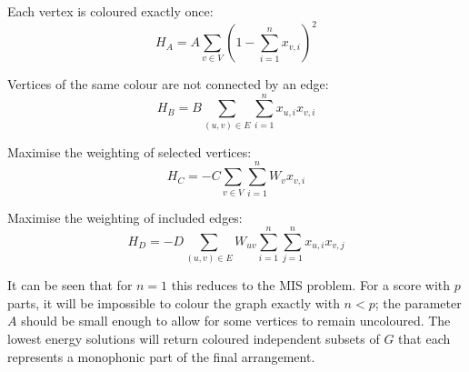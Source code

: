 \documentclass[aps,pra,12pt,onecolumn]{revtex4-2}
\begin{document}
Each vertex is coloured exactly once:
\begin{equation*}
    H_A = A\sum_{v \in V}\left(1-\sum_{i=1}^{n} x_{v,i}\right)^2
\end{equation*}

Vertices of the same colour are not connected by an edge:
\begin{equation*}
    H_B = B\sum_{(u,v) \in E}\sum_{i=1}^n x_{u,i}x_{v,i}
\end{equation*}

Maximise the weighting of selected vertices:
\begin{equation*}
    H_C = -C\sum_{v \in V}\sum_{i=1}^n W_vx_{v,i}
\end{equation*}

Maximise the weighting of included edges:
\begin{equation*}
    H_D = -D\sum_{(u,v)\in E}W_{uv}\sum_{i=1}^n\sum_{j=1}^n x_{u,i}x_{v,j}
\end{equation*}

It can be seen that for $n=1$ this reduces to the MIS problem. For a score with $p$ parts, it will be impossible to colour the graph exactly with $n<p$; the parameter $A$ should be small enough to allow for some vertices to remain uncoloured. The lowest energy solutions will return coloured independent subsets of $G$ that each represents a monophonic part of the final arrangement.
\end{document}
